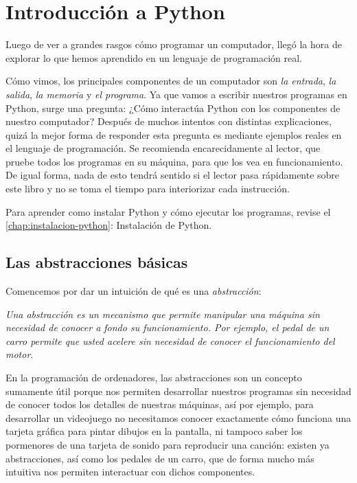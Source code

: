 \chapter{Introducción a Python}

Luego de ver a grandes rasgos cómo programar un computador, llegó la hora de explorar lo que hemos aprendido en un lenguaje de programación real. 

Cómo vimos, los principales componentes de un computador son \emph{la entrada}, \emph{la salida}, \emph{la memoria} y \emph{el programa}. Ya que vamos a escribir nuestros programas en Python, surge una pregunta: ¿Cómo interactúa Python con los componentes de nuestro computador? Después de muchos intentos con distintas explicaciones, quizá la mejor forma de responder esta pregunta es mediante ejemplos reales en el lenguaje de programación. Se recomienda encarecidamente al lector, que pruebe todos los programas en su máquina, para que los vea en funcionamiento. De igual forma, nada de esto tendrá sentido si el lector pasa rápidamente sobre este libro y no se toma el tiempo para interiorizar cada instrucción.

Para aprender como instalar Python y cómo ejecutar los programas, revise el \autoref{chap:instalacion-python}: Instalación de Python.

\section{Las abstracciones básicas}

Comencemos por dar un intuición de qué es una \emph{abstracción}:

\emph{Una abstracción es un mecanismo que permite manipular una máquina sin necesidad de conocer a fondo su funcionamiento. Por ejemplo, el pedal de un carro permite que usted acelere sin necesidad de conocer el funcionamiento del motor}. 

En la programación de ordenadores, las abstracciones son un concepto sumamente útil porque nos permiten desarrollar nuestros programas sin necesidad de conocer todos los detalles de nuestras máquinas, así por ejemplo, para desarrollar un videojuego no necesitamos conocer exactamente cómo funciona una tarjeta gráfica para pintar dibujos en la pantalla, ni tampoco saber los pormenores de una tarjeta de sonido para reproducir una canción: existen ya abstracciones, así como los pedales de un carro, que de forma mucho más intuitiva nos permiten interactuar con dichos componentes.

